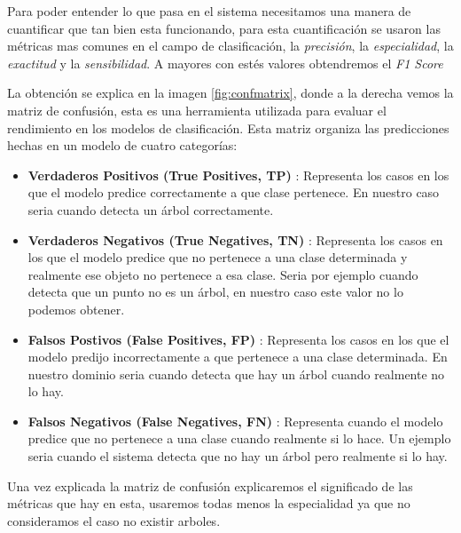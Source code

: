Para poder entender lo que pasa en el sistema necesitamos una manera de cuantificar que tan bien esta funcionando, para esta cuantificación se usaron las métricas mas comunes en el campo de clasificación, la \textit{precisión}, la \textit{especialidad}, la \textit{exactitud} y la \textit{sensibilidad}. A mayores con estés valores obtendremos el \textit{F1 Score}

La obtención se explica en la imagen \ref{fig:confmatrix}, donde a la derecha vemos la matriz de confusión, esta es una herramienta utilizada para evaluar el rendimiento en los modelos de clasificación. Esta matriz organiza las predicciones hechas en un modelo de cuatro categorías:

\begin{itemize}
    \item \textbf{Verdaderos Positivos (True Positives, TP)} : Representa los casos en los que el modelo predice correctamente a que clase pertenece. En nuestro caso seria cuando detecta un árbol correctamente.
    \item \textbf{Verdaderos Negativos (True Negatives, TN)} :  Representa los casos en los que el modelo predice que no pertenece a una clase determinada y realmente ese objeto no pertenece a esa clase. Seria por ejemplo cuando detecta que un punto no es un árbol, en nuestro caso este valor no lo podemos obtener.
    \item \textbf{Falsos Postivos (False Positives, FP)} : Representa los casos en los que el modelo predijo incorrectamente a que pertenece a una clase determinada. En nuestro dominio seria cuando detecta que hay un árbol cuando realmente no lo hay.
    \item \textbf{Falsos Negativos (False Negatives, FN)} : Representa cuando el modelo predice que no pertenece a una clase cuando realmente si lo hace. Un ejemplo seria cuando el sistema detecta que no hay un árbol pero realmente si lo hay.
\end{itemize}

Una vez explicada la matriz de confusión explicaremos el significado de las métricas que hay en esta, usaremos todas menos la especialidad ya que no consideramos el caso no existir arboles.

